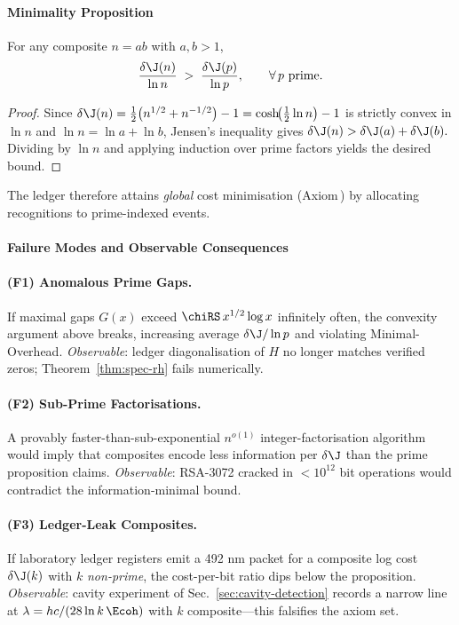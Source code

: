 \documentclass[11pt,oneside]{book}
\begin{document}
{\paragraph{Minimality Proposition}

\begin{proposition}
For any composite $n=ab$ with $a,b>1$,
\[
   \frac{\delta\J(n)}{\ln n}
   \;>\;
   \frac{\delta\J(p)}{\ln p},
   \qquad
   \forall\,p\ \text{prime}.
\]
\end{proposition}

\begin{proof}
Since
\(
   \delta\J(n)
   =\tfrac12\bigl(n^{1/2}+n^{-1/2}\bigr)-1
   =\cosh\!\bigl(\tfrac12\ln n\bigr)-1
\)
is strictly convex in $\ln n$ and
$\ln n=\ln a+\ln b$,
Jensen’s inequality gives
\(
   \delta\J(n)>\delta\J(a)+\delta\J(b).
\)
Dividing by $\ln n$ and applying induction over prime factors
yields the desired bound.
\end{proof}

The ledger therefore attains \emph{global} cost minimisation
(Axiom\,) by allocating recognitions to prime-indexed events.

\paragraph{Failure Modes and Observable Consequences}

\paragraph{(F1) Anomalous Prime Gaps.}
If maximal gaps $G(x)$ exceed
\(
   \chiRS\,x^{1/2}\log x
\)
infinitely often,
the convexity argument above breaks, increasing average
$\delta\J/\ln p$ and violating Minimal-Overhead.
\emph{Observable}: ledger diagonalisation of $H$ no longer matches
verified zeros; Theorem~\ref{thm:spec-rh} fails numerically.

\paragraph{(F2) Sub-Prime Factorisations.}
A provably faster-than-sub-exponential
$n^{o(1)}$ integer-factorisation algorithm would imply that
composites encode less information per $\delta\J$
than the prime proposition claims.
\emph{Observable}: RSA-3072 cracked in $<10^{12}$ bit operations would
contradict the information-minimal bound.

\paragraph{(F3) Ledger-Leak Composites.}
If laboratory ledger registers emit a 492 nm packet
for a composite log cost
$\delta\J(k)$ with $k$ \emph{non-prime},
the cost-per-bit ratio dips below the proposition.
\emph{Observable}: cavity experiment of
Sec.~\ref{sec:cavity-detection} records a narrow line at
\(
   \lambda = hc/(28\ln k\,\Ecoh)
\)
with $k$ composite—this falsifies the axiom set.

}
\end{document}
